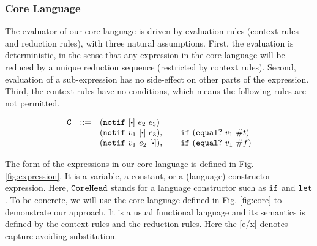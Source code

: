 \subsubsection{Core Language}


The evaluator of our core language is driven by evaluation rules (context rules and reduction rules), with three natural assumptions. First, the evaluation is deterministic, in the sense that any expression in the core language will be reduced by a unique reduction sequence (restricted by context rules). Second, evaluation of a sub-expression has no side-effect on other parts of the expression. Third, the context rules have no conditions, which means the following rules are not permitted.

{\footnotesize
\[
\begin{array}{lll}
\m{C}& ::= & (\m{notif}~[\bigcdot]~e_2~e_3)\\
&|& (\m{notif}~v_1~[\bigcdot]~e_3), \qquad \m{if}~(\m{equal}?~v_1~\true)\\
&|& (\m{notif}~v_1~e_2~[\bigcdot]), \qquad \m{if}~(\m{equal}?~v_1~\false)
\end{array}
\]}

The form of the expressions in our core language is defined in Fig. \ref{fig:expression}. It is a variable, a constant, or a (language) constructor expression. Here, $\mbox{\tt CoreHead}$ stands for a language constructor such as $\mbox{\tt if}$ and $\mbox{\tt let}$. To be concrete, we will use the core language defined in Fig.  \ref{fig:core} to demonstrate our approach. It is a usual functional language and its semantics is defined by the context rules and the reduction rules. Here the [e/x] denotes capture-avoiding substitution.

